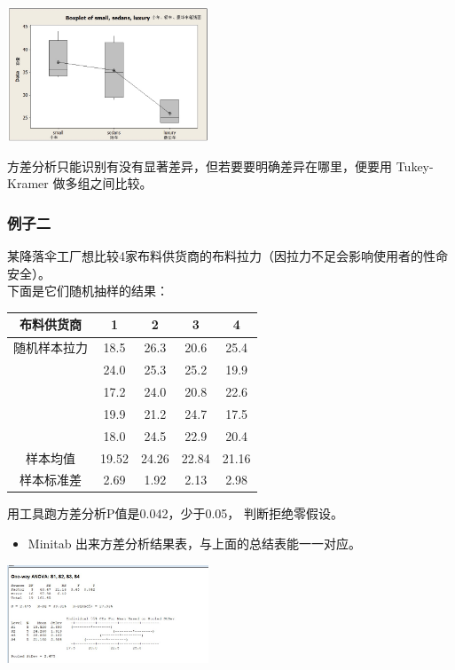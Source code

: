 \includegraphics[width=6cm]{5anovaBoxplot_of_small_sedans_luxury-1.jpg}

方差分析只能识别有没有显著差异，但若要要明确差异在哪里，便要用
Tukey-Kramer 做多组之间比较。

\hypertarget{ux4f8bux5b50ux4e8c}{%
\subsubsection{例子二}\label{ux4f8bux5b50ux4e8c}}

某降落伞工厂想比较4家布料供货商的布料拉力（因拉力不足会影响使用者的性命安全）。\\
下面是它们随机抽样的结果：


\begin{tabular}{|c|c|c|c|c|}
\hline
布料供货商&1&2&3&4\\
\hline
随机样本拉力&18.5&26.3&20.6&25.4\\
\hline
\:&24.0&25.3&25.2&19.9\\
\hline
\:&17.2&24.0&20.8&22.6\\
\hline
\:&19.9&21.2&24.7&17.5\\
\hline
\:&18.0&24.5&22.9&20.4\\
\hline
样本均值&19.52&24.26&22.84&21.16\\
\hline
样本标准差&2.69&1.92&2.13&2.98\\
\hline
\end{tabular}

用工具跑方差分析P值是0.042，少于0.05， 判断拒绝零假设。

\begin{itemize}
\tightlist
\item
  Minitab 出来方差分析结果表，与上面的总结表能一一对应。
\end{itemize}


\includegraphics[width=6cm]{AnovaParachutes807Screenshot_2022-08-07_124737.jpg}

